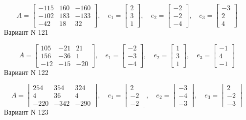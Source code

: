 \documentclass[11pt]{report}
\begin{document}
$$A = \left[\begin{matrix}-115 & 160 & -160\\-102 & 183 & -133\\-42 & 18 & 32\end{matrix}\right],\quad e_1 = \left[\begin{matrix}2\\3\\1\end{matrix}\right],\quad e_2 = \left[\begin{matrix}-2\\-2\\-4\end{matrix}\right],\quad e_3 = \left[\begin{matrix}-3\\2\\4\end{matrix}\right]$$Вариант N 121

$$A = \left[\begin{matrix}105 & -21 & 21\\156 & -36 & 1\\-12 & -15 & -20\end{matrix}\right],\quad e_1 = \left[\begin{matrix}-2\\-3\\-4\end{matrix}\right],\quad e_2 = \left[\begin{matrix}1\\3\\1\end{matrix}\right],\quad e_3 = \left[\begin{matrix}-1\\4\\-1\end{matrix}\right]$$Вариант N 122

$$A = \left[\begin{matrix}254 & 354 & 324\\4 & 36 & 4\\-220 & -342 & -290\end{matrix}\right],\quad e_1 = \left[\begin{matrix}2\\-2\\-2\end{matrix}\right],\quad e_2 = \left[\begin{matrix}-3\\-4\\-3\end{matrix}\right],\quad e_3 = \left[\begin{matrix}2\\-2\\-3\end{matrix}\right]$$Вариант N 123
\end{document}
